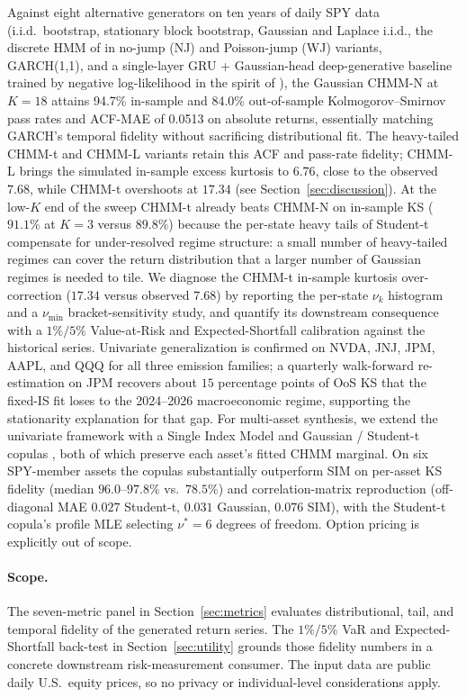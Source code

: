 Against eight alternative generators on ten years of daily SPY data (i.i.d.\ bootstrap, stationary block bootstrap, Gaussian and Laplace i.i.d., the discrete HMM of \citet{alswaidan2026hybrid} in no-jump (NJ) and Poisson-jump (WJ) variants, GARCH(1,1), and a single-layer GRU + Gaussian-head deep-generative baseline trained by negative log-likelihood in the spirit of \citet{yoon2019timegan}), the Gaussian CHMM-N at $K = 18$ attains 94.7\% in-sample and 84.0\% out-of-sample Kolmogorov--Smirnov pass rates and ACF-MAE of 0.0513 on absolute returns, essentially matching GARCH's temporal fidelity without sacrificing distributional fit.
The heavy-tailed CHMM-t and CHMM-L variants retain this ACF and pass-rate fidelity; CHMM-L brings the simulated in-sample excess kurtosis to $6.76$, close to the observed $7.68$, while CHMM-t overshoots at $17.34$ (see Section~\ref{sec:discussion}).
At the low-$K$ end of the sweep CHMM-t already beats CHMM-N on in-sample KS ($91.1\%$ at $K = 3$ versus $89.8\%$) because the per-state heavy tails of Student-t compensate for under-resolved regime structure: a small number of heavy-tailed regimes can cover the return distribution that a larger number of Gaussian regimes is needed to tile.
We diagnose the CHMM-t in-sample kurtosis over-correction ($17.34$ versus observed $7.68$) by reporting the per-state $\nu_k$ histogram and a $\nu_{\min}$ bracket-sensitivity study, and quantify its downstream consequence with a $1\%/5\%$ Value-at-Risk and Expected-Shortfall calibration against the historical series.
Univariate generalization is confirmed on NVDA, JNJ, JPM, AAPL, and QQQ for all three emission families; a quarterly walk-forward re-estimation on JPM recovers about $15$ percentage points of OoS KS that the fixed-IS fit loses to the 2024--2026 macroeconomic regime, supporting the stationarity explanation for that gap.
For multi-asset synthesis, we extend the univariate framework with a Single Index Model \cite{sharpe1963simplified} and Gaussian / Student-t copulas \cite{sklar1959fonctions, demarta2005tcopula, mcneil2015quantitative}, both of which preserve each asset's fitted CHMM marginal.
On six SPY-member assets the copulas substantially outperform SIM on per-asset KS fidelity (median $96.0$--$97.8\%$ vs.\ $78.5\%$) and correlation-matrix reproduction (off-diagonal MAE $0.027$ Student-t, $0.031$ Gaussian, $0.076$ SIM), with the Student-t copula's profile MLE selecting $\nu^{*} = 6$ degrees of freedom.
Option pricing is explicitly out of scope.

\paragraph{Scope.}
The seven-metric panel in Section~\ref{sec:metrics} evaluates distributional, tail, and temporal fidelity of the generated return series.
The $1\%/5\%$ VaR and Expected-Shortfall back-test in Section~\ref{sec:utility} grounds those fidelity numbers in a concrete downstream risk-measurement consumer.
The input data are public daily U.S.\ equity prices, so no privacy or individual-level considerations apply.

